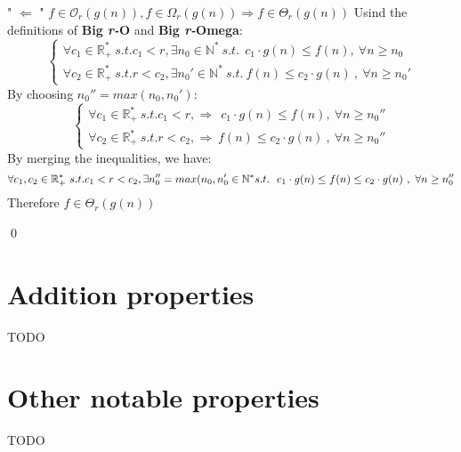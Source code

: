 " $\Leftarrow$ " $ f \in \mathcal{O}_{r}(g(n)), f \in \Omega_{r}(g(n)) \Rightarrow f \in \Theta_{r}(g(n)) $
Usind the definitions of \textbf{Big \textit{r-}O} and \textbf{Big \textit{r-}Omega}: 
  \[\begin{cases} \forall c_{1} \in \mathbb{R}^{*}_{+} \ s.t.  c_{1} < r , \exists n_{0} \in \mathbb{N}^{*}\ s.t.\ \ c_{1} \cdot g(n) \leq f(n) ,\  \forall n \geq n_{0} \\ \forall  c_{2} \in \mathbb{R}^{*}_{+} \ s.t.  r < c_{2} , \exists n_{0}' \in \mathbb{N}^{*}\ s.t.\ f(n) \leq c_{2} \cdot g(n)\ ,\  \forall n \geq n_{0}' \end{cases}\]
By choosing $n_{0}'' = max(n_{0}, n_{0}')$:
  \[\begin{cases} \forall c_{1} \in \mathbb{R}^{*}_{+} \ s.t.  c_{1} < r ,\Rightarrow\ \ c_{1} \cdot g(n) \leq f(n) ,\  \forall n \geq n_{0}'' \\ \forall  c_{2} \in \mathbb{R}^{*}_{+} \ s.t.  r < c_{2} , \Rightarrow \ f(n) \leq c_{2} \cdot g(n)\ ,\  \forall n \geq n_{0}'' \end{cases}\]
By merging the inequalities, we have:
  \[\forall c_{1}, c_{2} \in \mathbb{R}^{*}_{+} \ s.t.  c_{1} < r < c_{2} , \exists n_{0}'' = max(n_{0}, n_{0}' \in \mathbb{N}^{*}\ \\ s.t.\ \ c_{1} \cdot g(n) \leq f(n) \leq c_{2} \cdot g(n)\ ,\  \forall n \geq n_{0}'' \]
Therefore $f \in \Theta_{r}(g(n))$

\qed
 \hfill\break

 
 
 
\section{Addition properties}
TODO


\section{Other notable properties}
TODO
